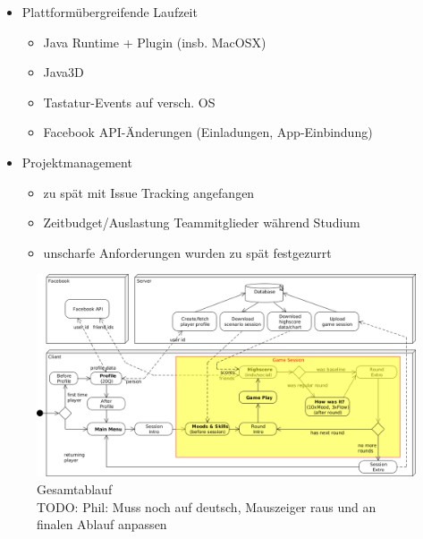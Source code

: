 \documentclass[a4paper,12pt]{scrartcl}
\begin{document}
\begin{itemize}
  \item Plattformübergreifende Laufzeit
  \begin{itemize}
    \item Java Runtime + Plugin (insb. MacOSX)
    \item Java3D
\item Tastatur-Events auf versch. OS
\item Facebook API-Änderungen (Einladungen, App-Einbindung)
  \end{itemize}
\item Projektmanagement
\begin{itemize}
  \item zu spät mit Issue Tracking angefangen
  \item Zeitbudget/Auslastung Teammitglieder während Studium
  \item unscharfe Anforderungen wurden zu spät festgezurrt
\end{itemize}

\end{itemize}

\begin{figure}[htp]
\begin{center}
  \includegraphics[width=\textwidth]{Gesamtablauf.png}
  \caption{Gesamtablauf\\
TODO: Phil: Muss noch auf deutsch, Mauszeiger raus und an finalen Ablauf anpassen}
  \label{fig:Gesamtablauf}
\end{center}
\end{figure} 


\clearpage

\clearpage
{}
\listoffigures
  
\clearpage
{}
{}

\end{document}
